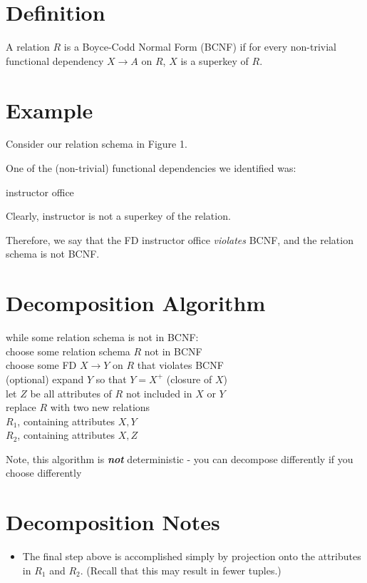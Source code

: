 \documentclass{../cheatsheet}
\begin{document}
\begin{multicols*}{2}
\section{Definition}
A relation $R$ is a Boyce-Codd Normal Form (BCNF) if for
every non-trivial functional dependency $X \rightarrow A$ on $R$, $X$ is a
superkey of $R$.

\section{Example}
Consider our relation schema in Figure 1.

One of the (non-trivial) functional dependencies we identified was:

\begin{center}
    instructor \textrightarrow office
\end{center}

Clearly, instructor is not a superkey of the relation.

Therefore, we say that the FD instructor \textrightarrow office
\textit{violates} BCNF, and the relation schema is not BCNF.

\section{Decomposition Algorithm}
while some relation schema is not in BCNF: \\
\tab choose some relation schema $R$ not in BCNF \\
\tab choose some FD $X \rightarrow Y$ on $R$ that violates BCNF \\
\tab (optional) expand $Y$ so that $Y = X^{+}$ (closure of $X$) \\
\tab let $Z$ be all attributes of $R$ not included in $X$ or $Y$ \\
\tab replace $R$ with two new relations \\
\tab\tab $R_1$, containing attributes ${X, Y}$ \\
\tab\tab $R_2$, containing attributes ${X, Z}$

Note, this algorithm is \textbf{\textit{not}} deterministic - you can decompose
differently if you choose differently

\section{Decomposition Notes}
\begin{itemize}
    \item The final step above is accomplished simply by projection onto the
        attributes in $R_1$ and $R_2$. (Recall that this may result in fewer
        tuples.)


\end{itemize}
\end{multicols*}
\end{document}
